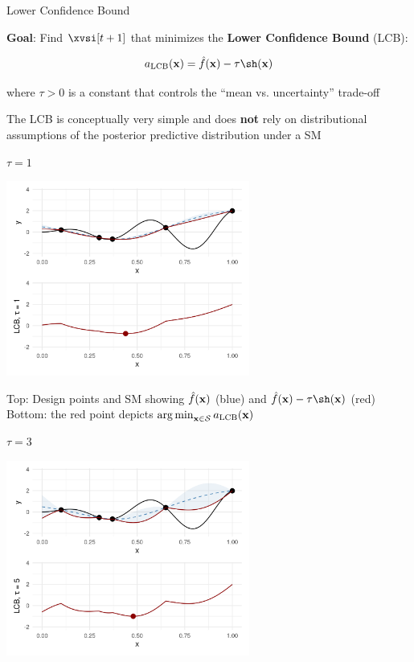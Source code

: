 \documentclass[11pt,compress,t,notes=noshow, xcolor=table]{beamer}
\begin{document}
\begin{vbframe}{Lower Confidence Bound}

\textbf{Goal}: Find $\xvsi[t+1]$ that minimizes the \textbf{Lower Confidence Bound} (LCB):

$$
  a_{\text{LCB}}(\xv) = \fh(\xv) - \tau \sh(\xv)
$$

where $\tau > 0$ is a constant that controls the \enquote{mean vs. uncertainty} trade-off\\

\vspace{1em}

The LCB is conceptually very simple and does \textbf{not} rely on distributional assumptions of the posterior predictive distribution under a SM

\framebreak

$\tau = 1$

\begin{center}
  \includegraphics[width = 0.6\textwidth]{figure_man/bayesian_loop_lcb_0.png}
\end{center}

Top: Design points and SM showing $\hat{f}(\mathbf{x})$ (blue) and $\fh(\xv) - \tau \sh(\xv)$ (red)\\
Bottom: the red point depicts $\operatorname*{arg\,min}_{\mathbf{x} \in \mathcal{S}} a_{\text{LCB}}(\mathbf{x})$

\framebreak

$\tau = 3$

\begin{center}
  \includegraphics[width = 0.6\textwidth]{figure_man/bayesian_loop_lcb_1.png}
\end{center}


\end{vbframe}
\end{document}
